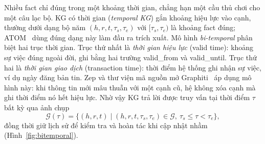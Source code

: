Nhiều fact chỉ đúng trong một khoảng thời gian, chẳng hạn một cầu thủ chơi cho một câu lạc bộ.
KG có thời gian (\textit{temporal KG}) gắn khoảng hiệu lực vào cạnh, thường dưới dạng bộ năm $(h, r, t, \tau_s, \tau_e)$ với $[\tau_s, \tau_e)$ là khoảng fact đúng; ATOM~\cite{lairgi2025atom} dùng đúng dạng này làm đầu ra trích xuất.
Mô hình \textit{bi-temporal} phân biệt hai trục thời gian.
Trục thứ nhất là \textit{thời gian hiệu lực} (valid time): khoảng sự việc đúng ngoài đời, ghi bằng hai trường valid\_from và valid\_until.
Trục thứ hai là \textit{thời gian giao dịch} (transaction time): thời điểm hệ thống ghi nhận sự việc, ví dụ ngày đăng bản tin.
Zep và thư viện mã nguồn mở Graphiti~\cite{rasmussen2025zep} áp dụng mô hình này: khi thông tin mới mâu thuẫn với một cạnh cũ, hệ không xóa cạnh mà ghi thời điểm nó hết hiệu lực.
Nhờ vậy KG trả lời được truy vấn tại thời điểm $\tau$ bất kỳ qua ảnh chụp
\begin{equation}
  \mathcal{G}(\tau) = \{(h, r, t) \mid (h, r, t, \tau_s, \tau_e) \in \mathcal{G},\ \tau_s \le \tau < \tau_e\},
\end{equation}
đồng thời giữ lịch sử để kiểm tra và hoàn tác khi cập nhật nhầm (Hình~\ref{fig:bitemporal}).

